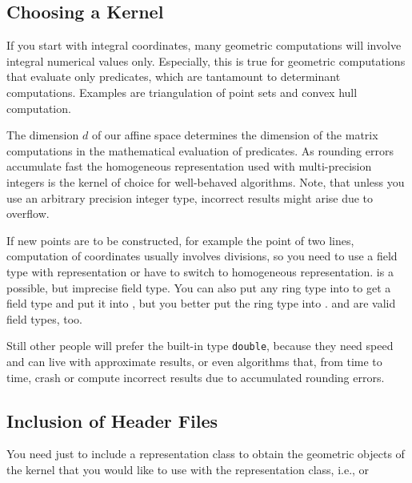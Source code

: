 \subsection{Choosing a Kernel}

If you start with integral  coordinates,
many geometric computations will involve integral numerical values
only. Especially, this is true for geometric computations that
evaluate only predicates, which are tantamount to determinant
computations. Examples are triangulation of point sets and convex hull
computation.  

The dimension $d$ of our affine space determines the dimension of the
matrix computations in the mathematical evaluation of predicates.  As
rounding errors accumulate fast the homogeneous representation used
with multi-precision integers is the kernel of choice for well-behaved
algorithms.  Note, that unless you use an arbitrary precision integer
type, incorrect results might arise due to overflow.

If new points are to be constructed, for example the
 point of two lines, computation of
 coordinates usually involves divisions,
so you need to use a field type with 
representation or have to switch to homogeneous representation.
 is a possible, but imprecise field type.  You can also
put any ring type into  to get a field type and put it
into , but you better put the ring type into
.   and  are valid
field types, too.

Still other people will prefer the built-in type {\tt double}, because
they need speed and can live with approximate results, or even
algorithms that, from time to time, crash or compute incorrect results
due to accumulated rounding errors.

\subsection{Inclusion of Header Files}

You need just to include a representation class to obtain the
geometric objects of the kernel that you would like to use with the
representation class, i.e.,  or


